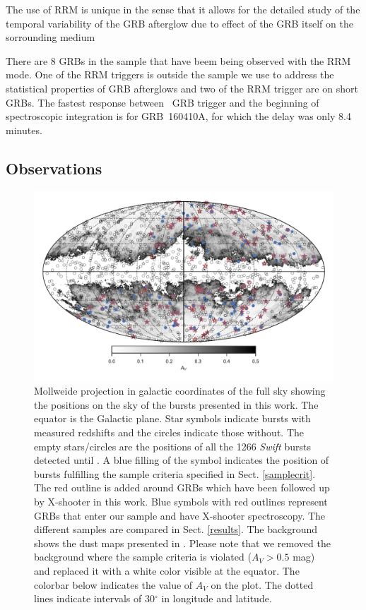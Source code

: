 \documentclass{aa}    %
\begin{document}
The use of RRM is unique in the sense that it allows for the detailed study of
the temporal variability of the GRB afterglow due to effect of the GRB itself on
the sorrounding medium \citep[e.g., see][for examples]{Dessauges-Zavadsky2006,
	Vreeswijk2007, Vreeswijk2013}

There are 8 GRBs in the sample that have beem being observed with the RRM mode.
One of the RRM triggers is outside the sample we use to address the statistical
properties of GRB afterglows and two of the RRM trigger are on short GRBs. The
fastest response between \swift~GRB trigger and the beginning of spectroscopic
integration is for GRB~160410A, for which the delay was only 8.4 minutes.


\subsection{Observations} \label{obs}


\begin{figure}
	\centerline{\includegraphics{figures/skymap.pdf}} \caption{Mollweide projection
	in galactic coordinates of the full sky showing the positions on the sky of the
	bursts presented in this work. The equator is the Galactic plane. Star symbols
	indicate bursts with measured redshifts and the circles indicate those without.
	The empty stars/circles are the positions of all the 1266 \textit{Swift} bursts
	detected until \termdate. A blue filling of the symbol indicates the
	position of bursts fulfilling the sample criteria specified in Sect.
	\ref{samplecrit}. The red outline is added around GRBs which have been followed
	up by X-shooter in this work. Blue symbols with red outlines represent GRBs
	that enter our sample and have X-shooter spectroscopy. The different samples
	are compared in Sect. \ref{results}. The background shows the dust maps
	presented in \citet{Schlegel1998}. Please note that we removed the background
	where the sample criteria is violated ($A_V > 0.5$ mag) and replaced it with a
	white color visible at the equator. The colorbar below indicates the value of
	$A_V$ on the plot. The dotted lines indicate intervals of 30$^\circ$ in
	longitude and latitude.} \label{fig:skymap}
\end{figure}
\end{document}
